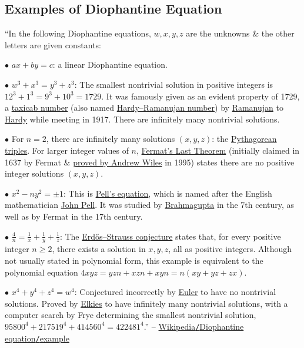 \documentclass{article}
\numberwithin{equation}{section}
\begin{document}
\subsection{Examples of Diophantine Equation}
``In the following Diophantine equations, $w,x,y,z$ are the unknowns \& the other letters are given constants:
\begin{enumerate*}
	\item[$\bullet$] $ax + by = c$: a linear Diophantine equation.
	\item[$\bullet$] $w^3 + x^3 = y^3 + z^3$: The smallest nontrivial solution in positive integers is $12^3 + 1^3 = 9^3 + 10^3 = 1729$. It was famously given as an evident property of 1729, a \href{https://en.wikipedia.org/wiki/Taxicab_number}{taxicab number} (also named \href{https://en.wikipedia.org/wiki/Hardy%E2%80%93Ramanujan_number}{Hardy--Ramanujan number}) by \href{https://en.wikipedia.org/wiki/Ramanujan}{Ramanujan} to \href{https://en.wikipedia.org/wiki/G._H._Hardy}{Hardy} while meeting in 1917. There are infinitely many nontrivial solutions.
	\item[$\bullet$] For $n = 2$, there are infinitely many solutions $(x,y,z)$: the \href{https://en.wikipedia.org/wiki/Pythagorean_triple}{Pythagorean triples}. For larger integer values of $n$, \href{https://en.wikipedia.org/wiki/Fermat%27s_Last_Theorem}{Fermat's Last Theorem} (initially claimed in 1637 by Fermat \& \href{https://en.wikipedia.org/wiki/Wiles%27s_proof_of_Fermat%27s_Last_Theorem}{proved by Andrew Wiles} in 1995) states there are no positive integer solutions $(x,y,z)$.
	\item[$\bullet$] $x^2 - ny^2 = \pm1$: This is \href{https://en.wikipedia.org/wiki/Pell%27s_equation}{Pell's equation}, which is named after the English mathematician \href{https://en.wikipedia.org/wiki/John_Pell_(mathematician)}{John Pell}. It was studied by \href{https://en.wikipedia.org/wiki/Brahmagupta}{Brahmagupta} in the 7th century, as well as by Fermat in the 17th century.
	\item[$\bullet$] $\frac{4}{n} = \frac{1}{x} + \frac{1}{y} + \frac{1}{z}$: The \href{https://en.wikipedia.org/wiki/Erd%C5%91s%E2%80%93Straus_conjecture}{Erd\H{o}s--Strauss conjecture} states that, for every positive integer $n\ge 2$, there exists a solution in $x,y,z$, all as positive integers. Although not usually stated in polynomial form, this example is equivalent to the polynomial equation $4xyz = yzn + xzn + xyn = n(xy + yz + zx)$.
	\item[$\bullet$] $x^4 + y^4 + z^4 = w^4$: Conjectured incorrectly by \href{https://en.wikipedia.org/wiki/Euler}{Euler} to have no nontrivial solutions. Proved by \href{https://en.wikipedia.org/wiki/Elkies}{Elkies} to have infinitely many nontrivial solutions, with a computer search by Frye determining the smallest nontrivial solution, $95800^4 + 217519^4 + 414560^4 = 422481^4$.'' -- \href{https://en.wikipedia.org/wiki/Diophantine_equation#Examples}{Wikipedia\texttt{/}Diophantine equation\texttt{/}example}
\end{enumerate*}
\end{document}
